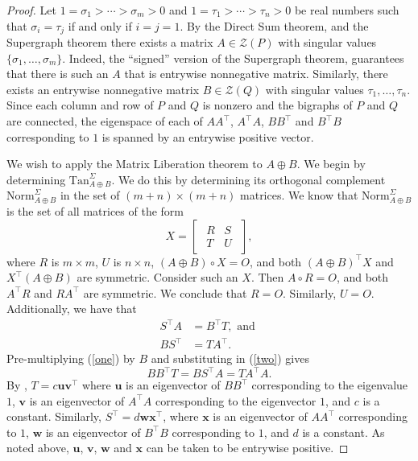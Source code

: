 \documentclass[preprint,12pt]{elsarticle}
\newcommand{\trans  }{^\top}
\begin{document}
\begin{proof}
Let $1=\sigma_1> \cdots > \sigma_m>0$
and $1=\tau_1> \cdots > \tau_n>0$ 
be real numbers such that $\sigma_i=\tau_j$ if and only if $i=j=1$. 
By the Direct Sum theorem, and the Supergraph theorem 
there exists a matrix $A \in \mathcal{Z}(P)$ 
with singular values $\{ \sigma_1, \ldots, \sigma_m\}$.
Indeed, the ``signed'' version of the Supergraph 
theorem, guarantees that there is such an $A$ 
that is entrywise nonnegative matrix.  Similarly, there exists an entrywise nonnegative matrix $B 
\in \mathcal{Z}(Q)$ with singular values 
$\tau_1, \ldots, \tau_n$.  Since each column and row of  $P$ and $Q$ is nonzero and the bigraphs of $P$ 
and $Q$ are connected, the eigenspace of each of  $AA\trans$, $A\trans A$, $BB\trans$ and $B\trans B$ 
corresponding to $1$ is spanned by an entrywise positive vector. 

We wish to apply the Matrix Liberation theorem to $A \oplus B$.  We begin by determining $\mbox{Tan}_{A\oplus B}^{\Sigma}$.  We do this by determining its orthogonal complement  $\mbox{Norm}_{A \oplus B}^{\Sigma}$ in the set  of $(m+n) \times (m+n)$ matrices.
We know that 
$\mbox{Norm}^{\Sigma}_{A \oplus B}$ is the 
set of 
all matrices of the form 
\[
X= 
\begin{bmatrix}
\begin{array}{c|c}
R& S \\  \hline 
T & U 
\end{array}
\end{bmatrix},
\]
where $R$ is $m \times m$, $U$ is $n\times n$,
 $(A \oplus B)\circ X=O$, 
and both $(A\oplus B)\trans X$ and $X \trans (A\oplus B)$ are symmetric. Consider such an $X$.
Then $A\circ R=O$, and both $A\trans R$
and $R A\trans$ are symmetric. We conclude that $R=O$.  Similarly, $U=O$.  Additionally, 
we have that 
\begin{align}
\label{one}
S\trans A&=B\trans T, \mbox{ and }\\ 
\label{two}
BS\trans &= T A \trans .
\end{align}
Pre-multiplying (\ref{one}) by $B$ and substituting in 
(\ref{two}) gives
\[ BB\trans T=BS\trans A=TA\trans A.\]
By , $T= c\mathbf u \mathbf v\trans$ where $\mathbf u$ is an eigenvector of $BB\trans$ corresponding to the eigenvalue $1$,  $\mathbf v$ is 
an eigenvector of $A\trans A$ corresponding to the eigenvector $1$, and $c$ is a constant. 
Similarly, $S\trans=d \mathbf w \mathbf x\trans$, 
where $\mathbf x$ is an eigenvector of $A A\trans$ corresponding to $1$, $\mathbf w$
is an eigenvector of $B\trans B$ corresponding to $1$, and $d$ is a constant. 
As  noted above, $\mathbf u$, $\mathbf v$, $\mathbf w$ and $\mathbf x$
can be taken to be entrywise positive. 


\end{proof}
\end{document}
